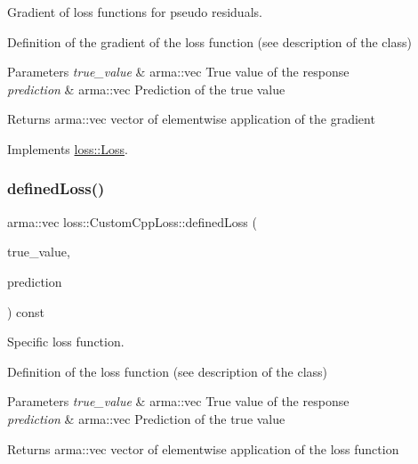 Gradient of loss functions for pseudo residuals. 

Definition of the gradient of the loss function (see description of the class)


\begin{DoxyParams}{Parameters}
{\em true\+\_\+value} & {\ttfamily arma\+::vec} True value of the response \\
\hline
{\em prediction} & {\ttfamily arma\+::vec} Prediction of the true value\\
\hline
\end{DoxyParams}
\begin{DoxyReturn}{Returns}
{\ttfamily arma\+::vec} vector of elementwise application of the gradient 
\end{DoxyReturn}


Implements \hyperlink{classloss_1_1_loss_a267a4de70747ade4b2d84ce35a448979}{loss\+::\+Loss}.

\mbox{\label{classloss_1_1_custom_cpp_loss_a5611805b67b0542449beb898051ab943}} 
\subsubsection{\texorpdfstring{defined\+Loss()}{definedLoss()}}
{\footnotesize\ttfamily arma\+::vec loss\+::\+Custom\+Cpp\+Loss\+::defined\+Loss (\begin{DoxyParamCaption}\item[{const arma\+::vec \&}]{true\+\_\+value,  }\item[{const arma\+::vec \&}]{prediction }\end{DoxyParamCaption}) const\hspace{0.3cm}{\ttfamily [virtual]}}



Specific loss function. 

Definition of the loss function (see description of the class)


\begin{DoxyParams}{Parameters}
{\em true\+\_\+value} & {\ttfamily arma\+::vec} True value of the response \\
\hline
{\em prediction} & {\ttfamily arma\+::vec} Prediction of the true value\\
\hline
\end{DoxyParams}
\begin{DoxyReturn}{Returns}
{\ttfamily arma\+::vec} vector of elementwise application of the loss function 
\end{DoxyReturn}



